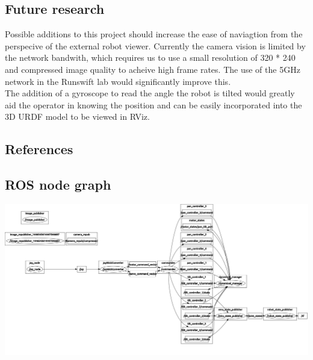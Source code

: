 \documentclass[titlepage,12pt,a4paper]{article}
\begin{document}
\section{Future research}
Possible additions to this project should increase the ease of naviagtion from the perspecive of the external robot viewer. Currently the camera vision is limited by the network bandwith, which requires us to use a small resolution of 320 * 240 and compressed image quality to acheive high frame rates. The use of the 5GHz network in the Runswift lab would significantly improve this.\\

\noindent The addition of a gyroscope to read the angle the robot is tilted would greatly aid the operator in knowing the position and can be easily incorporated into the 3D URDF model to be viewed in RViz.


\section{References}

\begin{appendices}
\chapter{ROS node graph}

\includegraphics[width=\textheight,angle=90,origin=c]{rosgraph.pdf}



\end{appendices}
\end{document}
